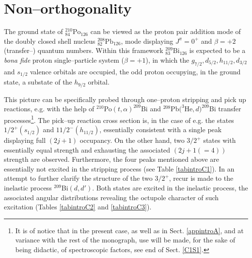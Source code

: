 \section{Non--orthogonality}\label{appintroC}
The ground state of $^{210}_{84}\text{Po}_{126}$ can be viewed as the proton pair addition mode of the doubly closed shell nucleus  $^{208}_{82}\text{Pb}_{126}$, mode displaying $J^\pi=0^+$ and $\beta=+2$ (transfer--) quantum numbers. Within this framework $^{209}_{83}\text{Bi}_{126}$ is expected to be a \emph{bona fide} proton single--particle system ($\beta=+1$), in which the $g_{7/2},d_{5/2},h_{11/2},d_{3/2}$ and $s_{1/2}$ valence orbitals are occupied, the odd proton occupying, in the ground state, a substate of the $h_{9/2}$ orbital.



This picture can be specifically probed through one--proton stripping and pick up reactions, e.g. with the help of $^{210}$Po$(t,\alpha)^{209}$Bi and $^{208}$Pb$(^3$He$,d)^{209}$Bi transfer processes\footnote{It is of notice that in the present case, as well as in Sect. \ref{appintroA}, and at variance with the rest of the monograph, use will be made, for the sake of being didactic, of spectroscopic factors, see end of Sect. \ref{C1S1}.}. The pick--up reaction cross section is, in the case of e.g. the states $1/2^+(s_{1/2})$ and $11/2^-(h_{11/2})$,  essentially consistent with a single peak displaying full $(2j+1)$ occupancy. On the other hand, two $3/2^+$ states with essentially equal strength and exhausting the associated $(2j+1(=4))$ strength are observed.   Furthermore,  the four peaks mentioned above are essentially not excited in the stripping process (see Table \ref{tabintroC1}). In an attempt to further clarify the structure of the two $3/2^+$, recur is made to the inelastic process $^{209}$Bi$(d,d')$. Both states are excited in the inelastic process, the associated  angular distributions  revealing the octupole character of such excitation (Tables \ref{tabintroC2} and \ref{tabintroC3}).

